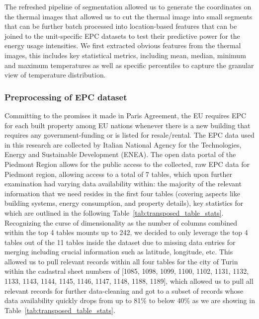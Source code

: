\documentclass[preprint,12pt]{elsarticle}
\begin{document}
    The refreshed pipeline of segmentation allowed us to generate the coordinates on the thermal images that allowed us to cut the thermal image into small segments that can be further batch processed into location-based features that can be joined to the unit-specific EPC datasets to test their predictive power for the energy usage intensities. We first extracted obvious features from the thermal images, this includes key statistical metrics, including mean, median, minimum and maximum temperatures as well as specific percentiles to capture the granular view of temperature distribution.
    
    
    \subsubsection{Preprocessing of EPC dataset}%
        Committing to the promises it made in Paris Agreement, the EU requires EPC for each built property among EU nations whenever there is a new building that requires any government-funding or is listed for resale/rental. The EPC data used in this research are collected by Italian National Agency for the Technologies, Energy and Sustainable Development (ENEA). The open data portal of the Piedmont Region allows for the public access to the collected, raw EPC data for Piedmont region, allowing access to 
        a total of 7 tables, which upon further examination had varying data availability within: 
        the majority of the relevant information that we need resides in the first four tables (covering aspects like building systems, energy consumption, and property details), key statistics for which are outlined in the following Table~\ref{tab:transposed_table_stats}. 
        Recognizing the curse of dimensionality as the number of columns combined within the top 4 tables mounts up to 242, we decided to only leverage the top 4 tables out of the 11 tables inside the dataset due to missing data entries for merging including crucial information such as latitude, longitude, etc. This allowed us to pull relevant records within all four tables for the city of Turin within the cadastral sheet numbers of [1085, 1098, 1099, 1100, 1102, 1131, 1132, 1133, 1143, 1144, 1145, 1146, 1147, 1148, 1188, 1189], which allowed us to pull all relevant records for further data-cleaning and got to a subset of records whose data availability quickly drops from up to 81\% to below 40\% as we are showing in Table~\ref{tab:transposed_table_stats}.
    
\end{document}
